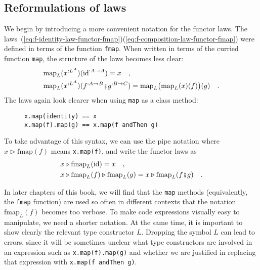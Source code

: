 \subsection{Reformulations of laws}

We begin by introducing a more convenient notation for the functor
laws. The laws~(\ref{eq:f-identity-law-functor-fmap})\textendash (\ref{eq:f-composition-law-functor-fmap})
were defined in terms of the function \lstinline!fmap!. When written
in terms of the curried function \lstinline!map!, the structure of
the laws becomes less clear:
\begin{align*}
 & \text{map}_{L}(x^{:L^{A}})(\text{id}^{:A\rightarrow A})=x\quad,\\
 & \text{map}_{L}(x^{:L^{A}})(f^{:A\rightarrow B}\bef g^{:B\rightarrow C})=\text{map}_{L}\big(\text{map}_{L}(x)(f)\big)(g)\quad.
\end{align*}
The laws again look clearer when using \lstinline!map! as a class
method:

\begin{wrapfigure}{l}{0.4\columnwidth}%
\vspace{-0.8\baselineskip}
\begin{lstlisting}
x.map(identity) == x
x.map(f).map(g) == x.map(f andThen g)
\end{lstlisting}

\vspace{-0.5\baselineskip}
\end{wrapfigure}%
To take advantage of this syntax, we can use the pipe
notation where $x\triangleright\text{fmap}(f)$ means \lstinline!x.map(f)!,
and write the functor laws as
\begin{align*}
 & x\triangleright\text{fmap}_{L}(\text{id})=x\quad,\\
 & x\triangleright\text{fmap}_{L}(f)\triangleright\text{fmap}_{L}(g)=x\triangleright\text{fmap}_{L}(f\bef g)\quad.
\end{align*}

In later chapters of this book, we will find that the \lstinline!map!
methods (equivalently, the \lstinline!fmap! function) are used so
often in different contexts that the notation $\text{fmap}_{L}(f)$
becomes too verbose. To make code expressions visually easy to manipulate,
we need a shorter notation. At the same time, it is important to show
clearly the relevant type constructor $L$. Dropping the symbol $L$
can lead to errors, since it will be sometimes unclear what type constructors
are involved in an expression such as \lstinline!x.map(f).map(g)!
and whether we are justified in replacing that expression with \lstinline!x.map(f andThen g)!.

